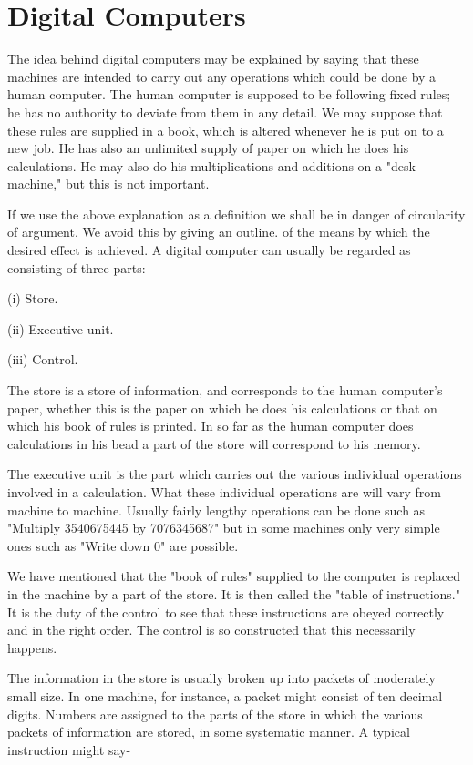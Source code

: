 \documentclass{article}
\begin{document}
\section{Digital Computers}

The idea behind digital computers may be explained by saying that these machines are intended to carry out any operations which could be done by a human computer. The human computer is supposed to be following fixed rules; he has no authority to deviate from them in any detail. We may suppose that these rules are supplied in a book, which is altered whenever he is put on to a new job. He has also an unlimited supply of paper on which he does his calculations. He may also do his multiplications and additions on a "desk machine," but this is not important.

If we use the above explanation as a definition we shall be in danger of circularity of argument. We avoid this by giving an outline. of the means by which the desired effect is achieved. A digital computer can usually be regarded as consisting of three parts:

(i) Store.

(ii) Executive unit.

(iii) Control.

The store is a store of information, and corresponds to the human computer's paper, whether this is the paper on which he does his calculations or that on which his book of rules is printed. In so far as the human computer does calculations in his bead a part of the store will correspond to his memory.

The executive unit is the part which carries out the various individual operations involved in a calculation. What these individual operations are will vary from machine to machine. Usually fairly lengthy operations can be done such as "Multiply 3540675445 by 7076345687" but in some machines only very simple ones such as "Write down 0" are possible.

We have mentioned that the "book of rules" supplied to the computer is replaced in the machine by a part of the store. It is then called the "table of instructions." It is the duty of the control to see that these instructions are obeyed correctly and in the right order. The control is so constructed that this necessarily happens.

The information in the store is usually broken up into packets of moderately small size. In one machine, for instance, a packet might consist of ten decimal digits. Numbers are assigned to the parts of the store in which the various packets of information are stored, in some systematic manner. A typical instruction might say-
\end{document}

